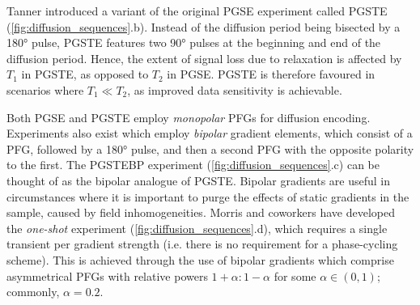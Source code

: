 Tanner introduced a variant of the original \ac{PGSE} experiment called
\ac{PGSTE}\cite{Tanner1970} (\cref{fig:diffusion_sequences}.b). Instead
of the diffusion period being bisected by a
\ang{180} pulse, \ac{PGSTE} features two \ang{90} pulses at the beginning and
end of the diffusion period.
Hence, the extent of signal loss due to relaxation is affected by $T_1$ in
\ac{PGSTE}, as opposed to $T_2$ in \ac{PGSE}. \ac{PGSTE} is therefore favoured
in scenarios where $T_1 \ll T_2$, as improved data sensitivity is achievable.

Both \ac{PGSE} and \ac{PGSTE} employ \emph{monopolar} \acp{PFG} for diffusion
encoding.
Experiments also exist which employ
\emph{bipolar} gradient elements, which consist of a
\ac{PFG}, followed by a \ang{180} pulse, and then a second \ac{PFG} with the
opposite polarity to the first\cite{Cotts1989,Wu1995}. The \ac{PGSTEBP} experiment
(\cref{fig:diffusion_sequences}.c) can be thought of as the bipolar analogue of
\ac{PGSTE}.
Bipolar gradients are useful in circumstances where it is important to purge
the effects of static gradients in the sample, caused by field inhomogeneities.
Morris and coworkers have developed the \emph{one-shot}
experiment\cite{Pelta2002} (\cref{fig:diffusion_sequences}.d), which requires a
single transient per gradient strength (i.e. there is no requirement for a
phase-cycling scheme).  This is achieved through the use of bipolar gradients
which comprise asymmetrical \acp{PFG} with relative powers $1 + \alpha : 1 -
\alpha$ for some $\alpha \in (0, 1)$; commonly, $\alpha=0.2$.

